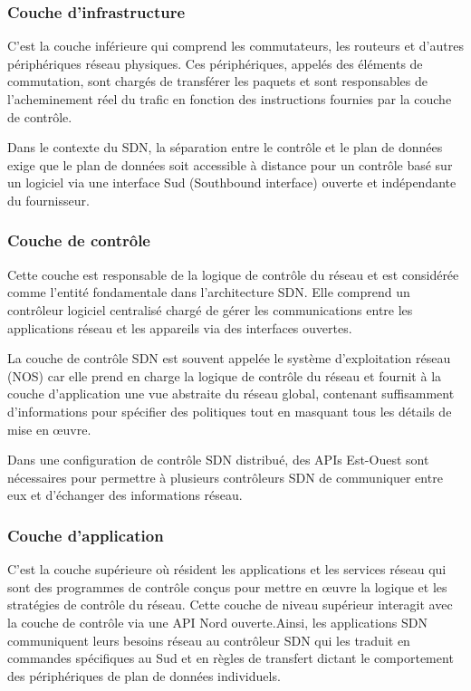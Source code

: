 \subsubsection{Couche d'infrastructure }

C'est la couche inférieure qui comprend les commutateurs, les routeurs et d'autres périphériques réseau physiques. Ces périphériques, appelés des éléments de commutation, sont chargés de transférer les paquets et sont responsables de l'acheminement réel du trafic en fonction des instructions fournies par la couche de contrôle.

Dans le contexte du SDN, la séparation entre le contrôle et le plan de données exige que le plan de données soit accessible à distance pour un contrôle basé sur un logiciel via une interface Sud (Southbound interface) ouverte et indépendante du fournisseur.
\subsubsection{Couche de contrôle }

Cette couche est responsable de la logique de contrôle du réseau et est considérée comme l'entité fondamentale dans l'architecture SDN. Elle comprend un contrôleur logiciel centralisé chargé de gérer les communications entre les applications réseau et les appareils via des interfaces ouvertes.

La couche de contrôle SDN est souvent appelée le système d'exploitation réseau (NOS) car elle prend en charge la logique de contrôle du réseau et fournit à la couche d'application une vue abstraite du réseau global, contenant suffisamment d'informations pour spécifier des politiques tout en masquant tous les détails de mise en œuvre.

Dans une configuration de contrôle SDN distribué, des APIs Est-Ouest sont nécessaires pour permettre à plusieurs contrôleurs SDN de communiquer entre eux et d'échanger des informations réseau. 

\subsubsection{Couche d'application }

C'est la couche supérieure où résident les applications et les services réseau qui sont des programmes de contrôle conçus pour mettre en œuvre la logique et les stratégies de contrôle du réseau. Cette couche de niveau supérieur interagit avec la couche de contrôle via une API Nord ouverte.Ainsi, les applications SDN communiquent leurs besoins réseau au contrôleur SDN qui les traduit en commandes spécifiques au Sud et en règles de transfert dictant le comportement des périphériques de plan de données individuels.

